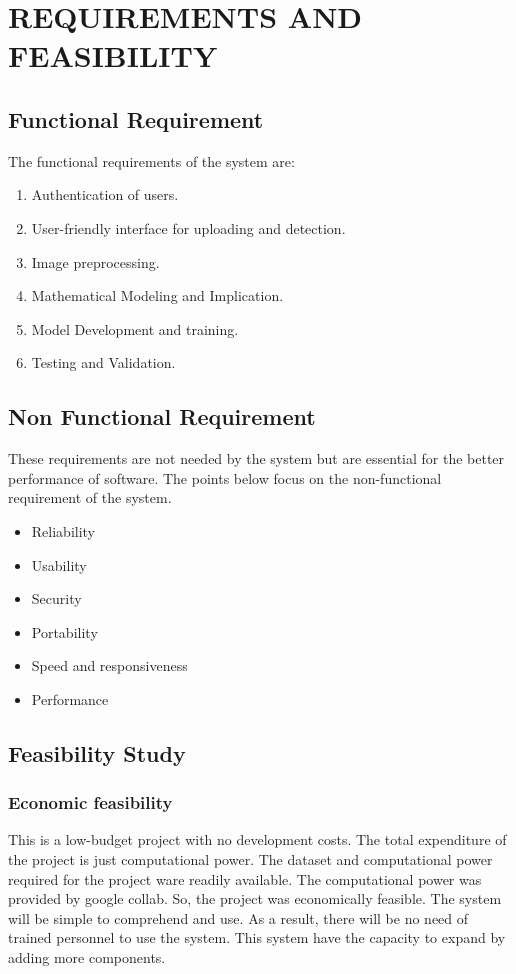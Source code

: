 
\section{REQUIREMENTS AND FEASIBILITY }

\subsection{Functional Requirement}
The functional requirements of the system are:
\begin{enumerate}
    \item Authentication of users.
    \item User-friendly interface for uploading and detection.
    \item Image preprocessing.
    \item Mathematical Modeling and Implication. 
    \item Model Development and training.
    \item Testing and Validation.

\end{enumerate}

\subsection{Non Functional Requirement}
\justify
These requirements are not needed by the system but are essential for the better
performance of software. The points below focus on the non-functional requirement of
the system.
\begin{itemize}
    \item Reliability
    \item   Usability
    \item   Security
    \item   Portability
    \item   Speed and responsiveness
    \item  Performance
\end{itemize}

\subsection{Feasibility Study}

\subsubsection{Economic feasibility}
This is a low-budget project with no development costs. The total expenditure of the
project is just computational power. The dataset and computational power required for
the project ware readily available. The computational power was provided by google
collab. So, the project was economically feasible. The system will be simple to
comprehend and use. As a result, there will be no need of trained personnel to use the
system. This system have the capacity to expand by adding more components.

